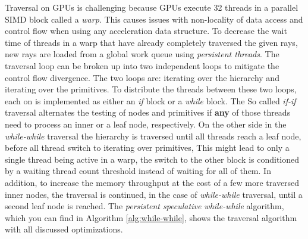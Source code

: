 Traversal on GPUs is challenging because GPUs execute 32 threads in a parallel SIMD block called a \textit{warp}. This causes issues with non-locality of data access and control flow when using any acceleration data structure. To decrease the wait time of threads in a warp that have already completely traversed the given rays, new rays are loaded from a global work queue using \textit{persistent threads}. The traversal loop can be broken up into two independent loops to mitigate the control flow divergence.  The two loops are: iterating over the hierarchy and iterating over the primitives\cite{AL09}. To distribute the threads between these two loops, each on is implemented as either an \textit{if} block or a \textit{while} block. The So called \textit{if-if} traversal alternates the testing of nodes and primitives if \textbf{any} of those threads need to process an inner or a leaf node, respectively. On the other side in the \textit{while-while} traversal the hierarchy is traversed until all threads reach a leaf node, before all thread switch to iterating over primitives, This might lead to only a single thread being active in a warp, the switch to the other block is conditioned by a waiting thread count threshold instead of waiting for all of them. In addition, to increase the memory throughput at the cost of a few more traversed inner nodes, the traversal is continued, in the case of \textit{while-while} traversal, until a second leaf node is reached. The \textit{persistent speculative while-while} algorithm, which you can find in Algorithm \ref{alg:while-while}, shows the traversal algorithm with all discussed optimizations. \cite{Meister2021}


